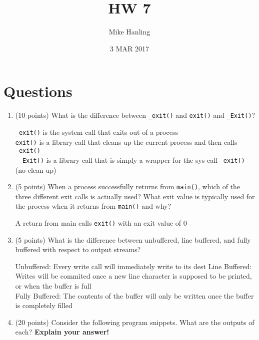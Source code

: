 \documentclass{article}[9pt]
\title{HW 7}
\author{Mike Hanling}
\date{3 MAR 2017}
\newenvironment{answerfont}{\fontfamily{qhv}\selectfont}{\par}
\newenvironment{myanswer}{\begin{mdframed}\begin{answerfont}}{\end{answerfont}\end{mdframed}}
\begin{document}
\maketitle

\section*{Questions}
\label{sec:orgfce6862}

\begin{enumerate}
\item (10 points) What is the difference between \texttt{\_exit()} and \texttt{exit()} and \texttt{\_Exit()}?

  \begin{myanswer}
    \texttt{\_exit()} is the system call that exits out of a process\\
    \texttt{exit()} is a library call that cleans up the current process
    and then calls \texttt{\_exit()}\\\
    \texttt{\_Exit()} is a library call that is simply a wrapper for the
    sys call \texttt{\_exit()} (no clean up)
  \end{myanswer}

\item (5 points) When a process successfully returns from \texttt{main()}, which of the
three different exit calls is actually used? What exit value is
typically used for the process when it returns from \texttt{main()} and
why?

  \begin{myanswer}
    A return from main calls \texttt{exit()} with an exit value of 0
  \end{myanswer}

\item (5 points) What is the difference between unbuffered, line buffered, and
fully buffered with respect to output streams?

  \begin{myanswer}
    Unbuffered: Every write call will immediately write to its dest
    Line Buffered: Writes will be commited once a new line character is
    supposed to be printed, or when the buffer is full\\
    Fully Buffered: The contents of the buffer will only be written once
    the buffer is completely filled
  \end{myanswer}

\item (20 points) Consider the following program snippets. What are the outputs of
each? \textbf{Explain your answer!}


\end{enumerate}
\end{document}
